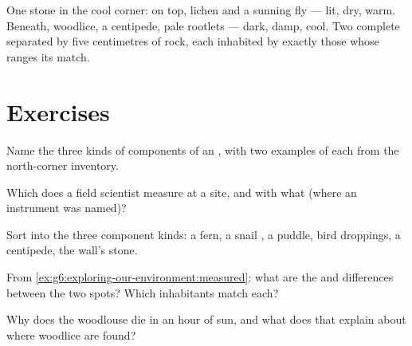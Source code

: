 \begin{example}\label{ex:g6:exploring-our-environment:stone}
One stone in the cool corner: on top, lichen and a sunning
fly --- lit, dry, warm. Beneath, woodlice, a centipede, pale
rootlets --- dark, damp, cool. Two complete 
separated by five centimetres of rock, each inhabited by
exactly those  whose ranges its 
match.
\end{example}

\section{Exercises}

\begin{exercise}[$\star$]\label{exo:g6:exploring-our-environment:1}
Name the three kinds of components of an , with
two examples of each from the north-corner inventory.
\end{exercise}

\begin{exercise}[$\star$]\label{exo:g6:exploring-our-environment:2}
Which  does a field scientist measure at a site,
and with what (where an instrument was named)?
\end{exercise}

\begin{exercise}[$\star$]\label{exo:g6:exploring-our-environment:3}
Sort into the three component kinds: a fern, a snail , a
puddle, bird droppings, a centipede, the wall's stone.
\end{exercise}

\begin{exercise}[$\star$]\label{exo:g6:exploring-our-environment:4}
From \cref{ex:g6:exploring-our-environment:measured}: what
are the  and  differences between the two
spots? Which inhabitants match each?
\end{exercise}

\begin{exercise}[$\star$]\label{exo:g6:exploring-our-environment:5}
Why does the woodlouse die in an hour of sun, and what does
that explain about where woodlice are found?
\end{exercise}

